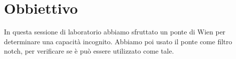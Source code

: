 \section*{Obbiettivo}

In questa sessione di laboratorio abbiamo sfruttato un ponte di Wien per determinare una capacità incognito.
Abbiamo poi usato il ponte come filtro notch, per verificare se è può essere utilizzato come tale.
